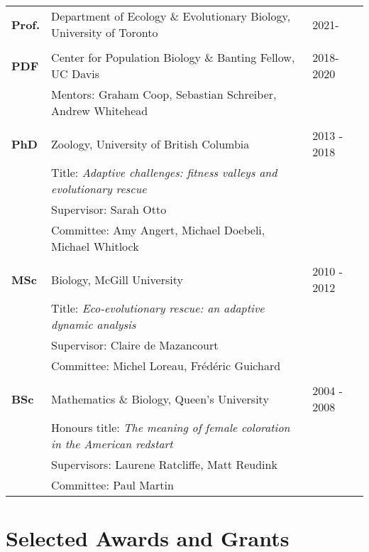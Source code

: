 \documentclass[12pt]{article}
\begin{document}
\begin{tabular}{lll}
\textbf{Prof.} & Department of Ecology \& Evolutionary Biology, University of Toronto\hspace{0.5cm} & 2021-\\
\\
\textbf{PDF} & Center for Population Biology \& Banting Fellow, UC Davis & 2018-2020\\
& Mentors: Graham Coop, Sebastian Schreiber, Andrew Whitehead\\
\\


\textbf{PhD} & Zoology, University of British Columbia & 2013 - 2018\\
& Title: \textit{Adaptive challenges: fitness valleys and evolutionary rescue}\\
& Supervisor: Sarah Otto\\
& Committee: Amy Angert, Michael Doebeli, Michael Whitlock\\
\\
\textbf{MSc} & Biology, McGill University & 2010 - 2012 \\
& Title: \textit{Eco-evolutionary rescue: an adaptive dynamic analysis}  \\
& Supervisor: Claire de Mazancourt\\
& Committee: Michel Loreau, Fr\'{e}d\'{e}ric Guichard\\
\\
\textbf{BSc} &  Mathematics \& Biology, Queen's University & 2004 - 2008\\ %
& Honours title: \textit{The meaning of female coloration in the American redstart}  \\
& Supervisors: Laurene Ratcliffe, Matt Reudink\\
& Committee: Paul Martin\\
\end{tabular}

\section*{Selected Awards and Grants}
\end{document}
